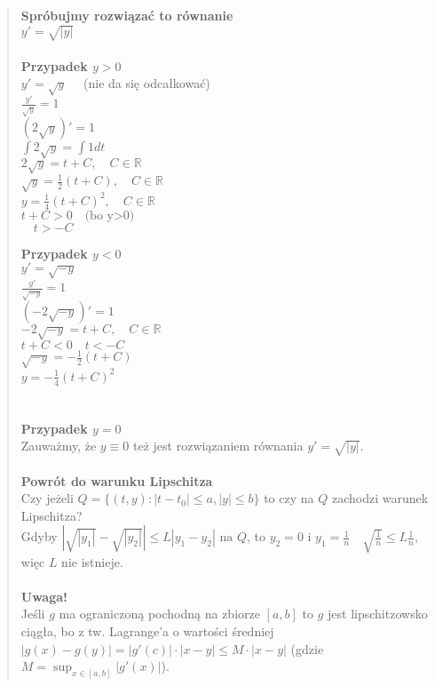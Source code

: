\documentclass[10pt,a4paper]{article}
\begin{document}
{\begin{quote}
\textbf{Spróbujmy rozwiązać to równanie}\\
$y' = \sqrt{|y|}$\\\\
\textbf{Przypadek $y > 0$}\\
$y' = \sqrt{y} \quad$ (nie da się odcałkować) \\
$\frac{y'}{\sqrt{y}} = 1$\\
$\left( 2\sqrt{y} \right)' = 1$ \\
$\int 2\sqrt{y} = \int 1 dt$ \\
$2\sqrt{y} = t + C, \quad C \in \mathbb{R}$ \\
$\sqrt{y} = \frac{1}{2}(t + C), \quad C \in \mathbb{R}$ \\
$y = \frac{1}{4}(t + C)^2, \quad C \in \mathbb{R}$ \\
$t+C > 0 \quad \text{(bo y>0)}$\\
$\quad t > -C$

\textbf{Przypadek $y < 0$}\\
$y' = \sqrt{-y}$\\
$\frac{y'}{\sqrt{-y}} = 1$\\
$\left( -2\sqrt{-y} \right)' = 1$ \\
$-2\sqrt{-y} = t + C, \quad C \in \mathbb{R}$\\
$t + C < 0 \quad t < -C$\\
$\sqrt{-y} = -\frac{1}{2}(t + C)$ \\
$y = -\frac{1}{4}(t + C)^2$\\\\\\

\textbf{Przypadek $y = 0$}\\
Zauważmy, że $y \equiv 0$ też jest rozwiązaniem równania $y' = \sqrt{|y|}$.\\\\
\textbf{Powrót do warunku Lipschitza}\\
Czy jeżeli $Q = \{(t,y): |t - t_0| \le a, |y| \le b\}$ to czy na $Q$ zachodzi warunek Lipschitza?\\
Gdyby $|\sqrt{|y_1|} - \sqrt{|y_2|}| \le L|y_1 - y_2| \text{ na } Q$, to 
$y_2=0$ i $y_1=\frac{1}{n} \quad \sqrt{\frac{1}{n}} \leq L\frac{1}{n}$, więc $L$ nie istnieje.\\\\
\textbf{Uwaga!}\\
Jeśli $g$ ma ograniczoną pochodną na zbiorze $[a,b]$ to $g$ jest lipschitzowsko ciągła, bo z tw. Lagrange'a o wartości średniej $|g(x) - g(y)| = |g'(c)| \cdot |x - y| \le M \cdot |x - y|$
(gdzie $M = \sup_{x \in [a,b]} |g'(x)|$).\\


\end{quote}}
\end{document}
